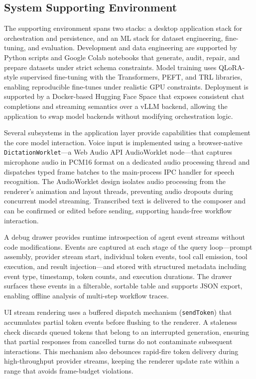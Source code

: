 \documentclass[conference]{IEEEtran}
\begin{document}
\subsection{System Supporting Environment}
The supporting environment spans two stacks: a desktop application stack for orchestration and persistence, and an ML stack for dataset engineering, fine-tuning, and evaluation. Development and data engineering are supported by Python scripts and Google Colab notebooks that generate, audit, repair, and prepare datasets under strict schema constraints. Model training uses QLoRA-style supervised fine-tuning with the Transformers, PEFT, and TRL libraries, enabling reproducible fine-tunes under realistic GPU constraints. Deployment is supported by a Docker-based Hugging Face Space that exposes consistent chat completions and streaming semantics over a vLLM backend, allowing the application to swap model backends without modifying orchestration logic.

Several subsystems in the application layer provide capabilities that complement the core model interaction. Voice input is implemented using a browser-native \texttt{DictationWorklet}---a Web Audio API AudioWorklet node---that captures microphone audio in PCM16 format on a dedicated audio processing thread and dispatches typed frame batches to the main-process IPC handler for speech recognition. The AudioWorklet design isolates audio processing from the renderer’s animation and layout threads, preventing audio dropouts during concurrent model streaming. Transcribed text is delivered to the composer and can be confirmed or edited before sending, supporting hands-free workflow interaction.

A debug drawer provides runtime introspection of agent event streams without code modifications. Events are captured at each stage of the query loop---prompt assembly, provider stream start, individual token events, tool call emission, tool execution, and result injection---and stored with structured metadata including event type, timestamp, token counts, and execution durations. The drawer surfaces these events in a filterable, sortable table and supports JSON export, enabling offline analysis of multi-step workflow traces.

UI stream rendering uses a buffered dispatch mechanism (\texttt{sendToken}) that accumulates partial token events before flushing to the renderer. A staleness check discards queued tokens that belong to an interrupted generation, ensuring that partial responses from cancelled turns do not contaminate subsequent interactions. This mechanism also debounces rapid-fire token delivery during high-throughput provider streams, keeping the renderer update rate within a range that avoids frame-budget violations.
\end{document}
